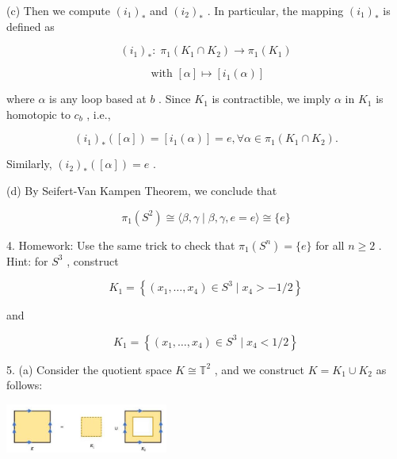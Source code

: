 (c) Then we compute \({\left( {i}_{1}\right) }_{ * }\) and \({\left( {i}_{2}\right) }_{ * }\) . In particular, the mapping \({\left( {i}_{1}\right) }_{ * }\) is defined as

\[
{\left( {i}_{1}\right) }_{ * } : \;{\pi }_{1}\left( {{K}_{1} \cap  {K}_{2}}\right)  \rightarrow  {\pi }_{1}\left( {K}_{1}\right)
\]

\[
\text{ with }\left\lbrack  \alpha \right\rbrack   \mapsto  \left\lbrack  {{i}_{1}\left( \alpha \right) }\right\rbrack
\]

where \(\alpha\) is any loop based at \(b\) . Since \({K}_{1}\) is contractible, we imply \(\alpha\) in \({K}_{1}\) is homotopic to \({c}_{b}\) , i.e.,

\[
{\left( {i}_{1}\right) }_{ * }\left( \left\lbrack  \alpha \right\rbrack  \right)  = \left\lbrack  {{i}_{1}\left( \alpha \right) }\right\rbrack   = e,\forall \alpha  \in  {\pi }_{1}\left( {{K}_{1} \cap  {K}_{2}}\right) .
\]

Similarly, \({\left( {i}_{2}\right) }_{ * }\left( \left\lbrack  \alpha \right\rbrack  \right)  = e\) .

(d) By Seifert-Van Kampen Theorem, we conclude that

\[
{\pi }_{1}\left( {S}^{2}\right)  \cong  \langle \beta ,\gamma  \mid  \beta ,\gamma ,e = e\rangle  \cong  \{ e\}
\]

4. Homework: Use the same trick to check that \({\pi }_{1}\left( {S}^{n}\right)  = \{ e\}\) for all \(n \geq  2\) . Hint: for \({S}^{3}\) , construct

\[
{K}_{1} = \left\{  {\left( {{x}_{1},\ldots ,{x}_{4}}\right)  \in  {S}^{3} \mid  {x}_{4} >  - 1/2}\right\}
\]

and

\[
{K}_{1} = \left\{  {\left( {{x}_{1},\ldots ,{x}_{4}}\right)  \in  {S}^{3} \mid  {x}_{4} < 1/2}\right\}
\]

5. (a) Consider the quotient space \(K \cong  {\mathbb{T}}^{2}\) , and we construct \(K = {K}_{1} \cup  {K}_{2}\) as follows:

\begin{center}
\includegraphics[max width=0.4\textwidth]{images/bo_d2bcsrref24c73avs720_151_718_1863_523_158_0.jpg}
\end{center}
\hspace*{3em} 


